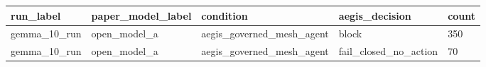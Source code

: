 \begin{tabular}{lllll}
 \hline
run\_label & paper\_model\_label & condition & aegis\_decision & count \\
 \hline
gemma\_10\_run & open\_model\_a & aegis\_governed\_mesh\_agent & block & 350 \\
gemma\_10\_run & open\_model\_a & aegis\_governed\_mesh\_agent & fail\_closed\_no\_action & 70 \\
 \hline
\end{tabular}
